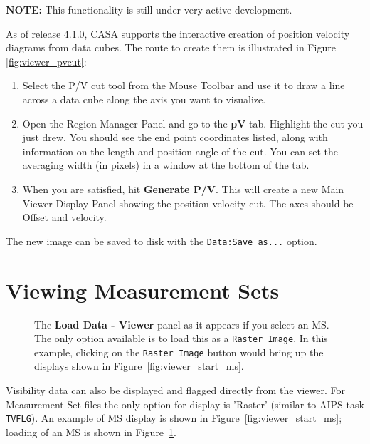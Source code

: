 {\bf NOTE:} This functionality is still under very active development.

As of release 4.1.0, CASA supports the interactive creation of position velocity diagrams from data cubes. The route to create them
is illustrated in Figure \ref{fig:viewer_pvcut}:

\begin{enumerate}
\item Select the P/V cut tool from the Mouse Toolbar and use it to draw a line across a data cube along the axis you want to visualize.
\item Open the Region Manager Panel and go to the {\bf pV} tab.  Highlight the cut you just drew. You should see the end point coordinates
listed, along with information on the length and position angle of the cut. You can set the averaging width (in pixels) in a window at the bottom
of the tab.
\item When you are satisfied, hit {\bf Generate P/V}. This will create a new Main Viewer Display Panel showing the position velocity cut. The axes should
be Offset and velocity.
\end{enumerate}

The new image can be saved to disk with the {\tt Data:Save as...} option.

\section{Viewing Measurement Sets}
\label{section:display.ms}

\begin{figure}[h!]
\begin{center}
\caption{\label{fig:viewer_load_ms} The {\bf Load Data - Viewer} panel
as it appears if you select an MS.  The only option available is
to load this as a {\tt Raster Image}.  In this example, clicking
on the {\tt Raster Image} button would bring up the displays shown
in Figure~\ref{fig:viewer_start_ms}.}
\hrulefill
\end{center}
\end{figure}

Visibility data can also be displayed and flagged directly from the
viewer. For Measurement Set files the only option for display is 'Raster'
(similar to AIPS task {\tt TVFLG}).  An example of MS display is
shown in Figure~\ref{fig:viewer_start_ms}; loading of an
MS is shown in Figure~\ref{fig:viewer_load_ms}.  

